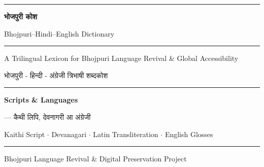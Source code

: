 \begin{titlepage}
\centering
\vspace*{1.5cm}

{\color{bpblue}\rule{\textwidth}{1.5pt}}

\vspace{1.2cm}

{\Huge\bfseries\color{bpblue}भोजपुरी कोश}

\vspace{0.6cm}

{\Large\color{bpbluelight}Bhojpuri--Hindi--English Dictionary}

\vspace{0.4cm}

{\color{bpgold}\rule{0.4\textwidth}{0.8pt}}

\vspace{0.8cm}

{\large\color{bpgray}A Trilingual Lexicon for Bhojpuri Language Revival \& Global Accessibility}

\vspace{0.3cm}

{\large\color{bpgray}भोजपुरी - हिन्दी - अंग्रेजी त्रिभाषी शब्दकोश}

\vspace{1.5cm}

\begin{minipage}{0.8\textwidth}
\centering
{\color{bpgraylight}\rule{\textwidth}{0.4pt}}

\vspace{0.4cm}

{\small\bfseries\color{bpblue}Scripts \& Languages}

\vspace{0.2cm}

{\small\color{bpgray}\K{\bka\bmai\btha\bmi\ \bla\bmi\bpa\bmi} --- कैथी लिपि, देवनागरी आ अंग्रेजी}

\vspace{0.1cm}

{\footnotesize\color{bpgray}Kaithi Script $\cdot$ Devanagari $\cdot$ Latin Transliteration $\cdot$ English Glosses}

\vspace{0.4cm}

{\color{bpgraylight}\rule{\textwidth}{0.4pt}}
\end{minipage}

\vfill

{\small\color{bpgray}Bhojpuri Language Revival \& Digital Preservation Project}

\end{titlepage}
